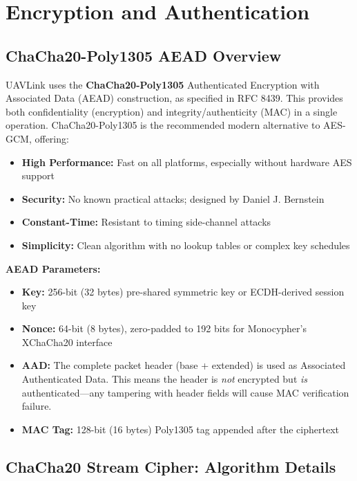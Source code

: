 \documentclass[11pt,a4paper]{article}
\begin{document}
\newpage
\section{Encryption and Authentication}

\subsection{ChaCha20-Poly1305 AEAD Overview}

UAVLink uses the \textbf{ChaCha20-Poly1305} Authenticated Encryption with Associated Data (AEAD) construction, as specified in RFC 8439. This provides both confidentiality (encryption) and integrity/authenticity (MAC) in a single operation. ChaCha20-Poly1305 is the recommended modern alternative to AES-GCM, offering:

\begin{itemize}[noitemsep]
    \item \textbf{High Performance:} Fast on all platforms, especially without hardware AES support
    \item \textbf{Security:} No known practical attacks; designed by Daniel J. Bernstein
    \item \textbf{Constant-Time:} Resistant to timing side-channel attacks
    \item \textbf{Simplicity:} Clean algorithm with no lookup tables or complex key schedules
\end{itemize}

\textbf{AEAD Parameters:}
\begin{itemize}[noitemsep]
    \item \textbf{Key:} 256-bit (32 bytes) pre-shared symmetric key or ECDH-derived session key
    \item \textbf{Nonce:} 64-bit (8 bytes), zero-padded to 192 bits for Monocypher's XChaCha20 interface
    \item \textbf{AAD:} The complete packet header (base + extended) is used as Associated Authenticated Data. This means the header is \emph{not} encrypted but \emph{is} authenticated---any tampering with header fields will cause MAC verification failure.
    \item \textbf{MAC Tag:} 128-bit (16 bytes) Poly1305 tag appended after the ciphertext
\end{itemize}

\subsection{ChaCha20 Stream Cipher: Algorithm Details}
\end{document}

